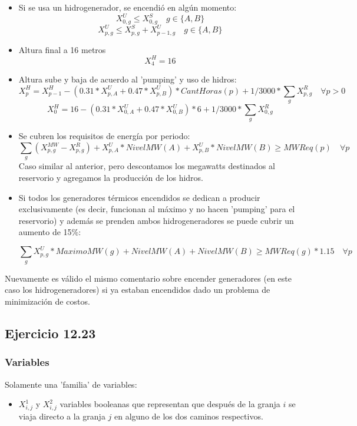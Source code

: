 \begin{itemize}
    \item Si se usa un hidrogenerador, se encendió en  algún momento:
    $$ X^U_{0,g} \leq X^S_{0,g} \quad g \in \{A,B\} $$
    $$ X^U_{p,g} \leq X^S_{p,g} + X^U_{p-1,g} \quad g \in \{A,B\} $$

    \item Altura final a 16 metros
    $$ X^H_{4} = 16 $$

    \item Altura sube y baja de acuerdo al 'pumping' y uso de hidros:
    $$ X^H_{p} =  X^H_{p-1} - (0.31 * X^U_{p,A} + 0.47 * X^U_{p,B}) * CantHoras(p) + 1/3000 * \sum_{g} X^R_{p,g} \quad \forall p>0 $$
    $$ X^H_{0} =  16 - (0.31 * X^U_{0,A} + 0.47 * X^U_{0,B}) * 6 + 1/3000 * \sum_{g} X^R_{0,g} $$

    \item Se cubren los requisitos de energía por periodo:
    $$ \sum_{g} (X^{MW}_{p,g} - X^R_{p,g}) + X^U_{p,A} * NivelMW(A) + X^U_{p,B} * NivelMW(B) \geq MWReq(p) \quad \forall p $$
    Caso similar al anterior, pero descontamos los megawatts destinados al reservorio y agregamos la producción de los hidros.

    \item Si todos los generadores térmicos encendidos se dedican a producir exclusivamente (es decir, funcionan al máximo y no hacen 'pumping' para el reservorio) y además se prenden ambos hidrogeneradores se puede cubrir un aumento de 15\%:

    $$ \sum_{g} X^{U}_{p,g}*MaximoMW(g) + NivelMW(A) + NivelMW(B) \geq MWReq(g)*1.15 \quad \forall p $$

\end{itemize}
Nuevamente es válido el mismo comentario sobre encender generadores (en este caso los hidrogeneradores) si ya estaban encendidos dado un problema de minimización de costos.


\subsection{Ejercicio 12.23}

\subsubsection{Variables}
Solamente una 'familia' de variables:
\begin{itemize}
    \item $X^1_{i,j}$ y $X^2_{i,j}$ variables booleanas que representan que después de la granja $i$ se viaja directo a la granja $j$ en alguno de los dos caminos respectivos.
\end{itemize}

